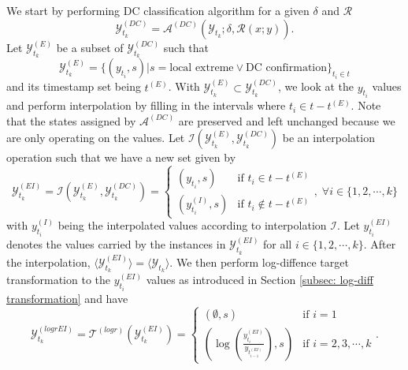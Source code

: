 We start by performing DC classification algorithm for a given $\delta$ and $\mathcal{R}$
\begin{equation*}
    \mathcal{Y}^{(DC)}_{t_k} = \mathcal{A}^{(DC)} (\mathcal{Y}_{t_k}; \delta, \mathcal{R} (x; y)).
\end{equation*}
Let $\mathcal{Y}^{(E)}_{t_k}$ be a subset of $\mathcal{Y}^{(DC)}_{t_k}$ such that
\begin{equation*}
    \mathcal{Y}^{(E)}_{t_k} = \{(y_{t_i}, s) | s = \text{local extreme} \vee \text{DC confirmation} \}_{t_i \in t}
\end{equation*}
and its timestamp set being $t^{(E)}$. With $\mathcal{Y}^{(E)}_{t_k} \subset \mathcal{Y}^{(DC)}_{t_k}$, we look at the $y_{t_i}$ values and perform interpolation by filling in the intervals where $t_i \in t - t^{(E)}$. Note that the states assigned by $\mathcal{A}^{(DC)}$ are preserved and left unchanged because we are only operating on the values. Let $\mathcal{I} (\mathcal{Y}^{(E)}_{t_k}, \mathcal{Y}^{(DC)}_{t_k})$ be an interpolation operation such that we have a new set given by
\begin{equation*}
    \mathcal{Y}^{(EI)}_{t_k} = \mathcal{I} (\mathcal{Y}^{(E)}_{t_k}, \mathcal{Y}^{(DC)}_{t_k}) = \begin{cases}
        (y_{t_i}, s)          &\text{if $t_i \in t - t^{(E)}$} \\
        (y^{(I)}_{t_i}, s)    &\text{if $t_i \notin t - t^{(E)}$}
    \end{cases}, \; \forall i \in \{1, 2, \cdots, k\}
\end{equation*}
with $y^{(I)}_{t_i}$ being the interpolated values according to interpolation $\mathcal{I}$. Let $y^{(EI)}_{t_i}$ denotes the values carried by the instances in $\mathcal{Y}^{(EI)}_{t_k}$ for all $i \in \{ 1, 2, \cdots, k\}$. After the interpolation, $\langle \mathcal{Y}^{(EI)}_{t_k} \rangle = \langle \mathcal{Y}_{t_k} \rangle$.
We then perform log-diffence target transformation to the $y^{(EI)}_{t_i}$ values as introduced in Section \ref{subsec: log-diff transformation} and have
\begin{equation*}
    \mathcal{Y}^{(logrEI)}_{t_k} = \mathcal{T}^{(logr)}(\mathcal{Y}^{(EI)}_{t_k}) = \begin{cases}
        (\emptyset, s)  &\text{if $i = 1$} \\
        (\log(\frac{y^{(EI)}_{t_i}}{y_{t^{(EI)}_{i-1}}}), s) &\text{if $i = 2, 3, \cdots, k$}
    \end{cases}.
\end{equation*}
